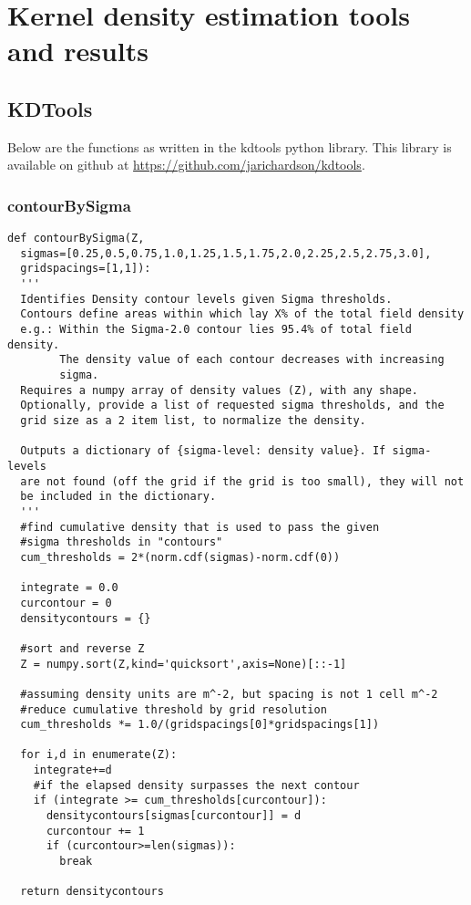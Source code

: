 \chapter{Kernel density estimation tools and results}\label{apdx_kdtoolsmaps}
\renewcommand*{\FigPath}{figures/chapter-spatial_density}
\section{KDTools}\label{sec_kdtoolscode}
Below are the functions as written in the kdtools python library. This library is available on github at \url{https://github.com/jarichardson/kdtools}.

\subsection{contourBySigma}
\begin{verbatim}
def contourBySigma(Z, 
  sigmas=[0.25,0.5,0.75,1.0,1.25,1.5,1.75,2.0,2.25,2.5,2.75,3.0],
  gridspacings=[1,1]):
  '''
  Identifies Density contour levels given Sigma thresholds.
  Contours define areas within which lay X% of the total field density
  e.g.: Within the Sigma-2.0 contour lies 95.4% of total field density.
        The density value of each contour decreases with increasing
        sigma.
  Requires a numpy array of density values (Z), with any shape.
  Optionally, provide a list of requested sigma thresholds, and the
  grid size as a 2 item list, to normalize the density.
  
  Outputs a dictionary of {sigma-level: density value}. If sigma-levels
  are not found (off the grid if the grid is too small), they will not
  be included in the dictionary.
  '''
  #find cumulative density that is used to pass the given
  #sigma thresholds in "contours"
  cum_thresholds = 2*(norm.cdf(sigmas)-norm.cdf(0))
  
  integrate = 0.0
  curcontour = 0
  densitycontours = {}
  
  #sort and reverse Z
  Z = numpy.sort(Z,kind='quicksort',axis=None)[::-1]
  
  #assuming density units are m^-2, but spacing is not 1 cell m^-2
  #reduce cumulative threshold by grid resolution
  cum_thresholds *= 1.0/(gridspacings[0]*gridspacings[1])
  
  for i,d in enumerate(Z):
    integrate+=d
    #if the elapsed density surpasses the next contour
    if (integrate >= cum_thresholds[curcontour]):
      densitycontours[sigmas[curcontour]] = d
      curcontour += 1
      if (curcontour>=len(sigmas)):
        break
  
  return densitycontours
\end{verbatim}

